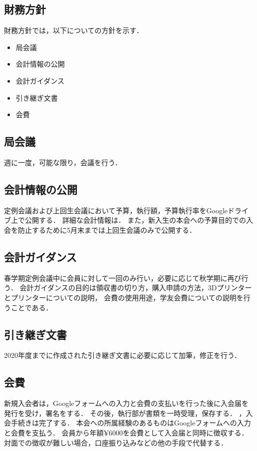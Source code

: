 \subsection*{財務方針}


財務方針では，以下についての方針を示す．
\begin{itemize}
  \item 局会議
  \item 会計情報の公開
  \item 会計ガイダンス
  \item 引き継ぎ文書
  \item 会費
\end{itemize}

\subsection*{局会議}
週に一度，可能な限り，会議を行う．

\subsection*{会計情報の公開}
定例会議および上回生会議において予算，執行額，予算執行率をGoogleドライブ上で公開する．
詳細な会計情報は．
また，新入生の本会への予算目的での入会を防止するために5月末までは上回生会議のみで公開する．

\subsection*{会計ガイダンス}
春学期定例会議中に会員に対して一回のみ行い，必要に応じて秋学期に再び行う．
会計ガイダンスの目的は領収書の切り方，購入申請の方法，3Dプリンターとプリンターについての説明，
会費の使用用途，学友会費についての説明を行うことである．

\subsection*{引き継ぎ文書}
2020年度までに作成された引き継ぎ文書に必要に応じて加筆，修正を行う．

\subsection*{会費}
新規入会者は，Googleフォームへの入力と会費の支払いを行った後に入会届を発行を受け，署名をする．
その後，執行部が書類を一時受理，保存する．
，入会手続きは完了する．
本会への所属経験のあるものはGoogleフォームへの入力と会費を支払う．
会員から年額¥6000を会費として入会届と同時に徴収する．
対面での徴収が難しい場合，口座振り込みなどの他の手段で代替する．
